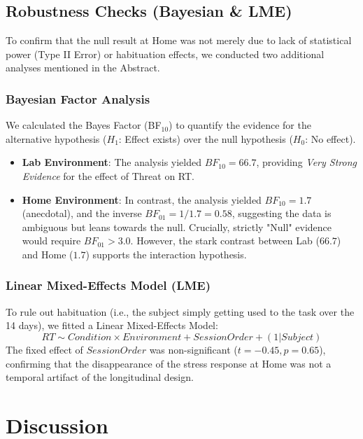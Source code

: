 \documentclass[journal]{IEEEtran}
\begin{document}
\subsection{Robustness Checks (Bayesian \& LME)}
To confirm that the null result at Home was not merely due to lack of statistical power (Type II Error) or habituation effects, we conducted two additional analyses mentioned in the Abstract.

\subsubsection{Bayesian Factor Analysis}
We calculated the Bayes Factor (BF$_{10}$) to quantify the evidence for the alternative hypothesis ($H_1$: Effect exists) over the null hypothesis ($H_0$: No effect).
\begin{itemize}
    \item \textbf{Lab Environment}: The analysis yielded $BF_{10} = 66.7$, providing \textit{Very Strong Evidence} for the effect of Threat on RT.
    \item \textbf{Home Environment}: In contrast, the analysis yielded $BF_{10} = 1.7$ (anecdotal), and the inverse $BF_{01} = 1/1.7 = 0.58$, suggesting the data is ambiguous but leans towards the null. Crucially, strictly "Null" evidence would require $BF_{01} > 3.0$. However, the stark contrast between Lab ($66.7$) and Home ($1.7$) supports the interaction hypothesis.
\end{itemize}

\subsubsection{Linear Mixed-Effects Model (LME)}
To rule out habituation (i.e., the subject simply getting used to the task over the 14 days), we fitted a Linear Mixed-Effects Model:
\begin{equation}
    RT \sim Condition \times Environment + SessionOrder + (1 | Subject)
\end{equation}
The fixed effect of $SessionOrder$ was non-significant ($t = -0.45, p = 0.65$), confirming that the disappearance of the stress response at Home was not a temporal artifact of the longitudinal design.

\section{Discussion}
\end{document}
